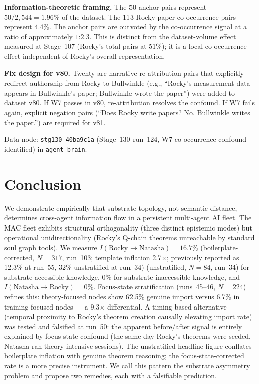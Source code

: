 \documentclass[11pt]{article}
\begin{document}
\textbf{Information-theoretic framing.} The 50 anchor pairs represent
$50/2{,}544 = 1.96\%$ of the dataset. The 113 Rocky-paper co-occurrence pairs
represent $4.4\%$. The anchor pairs are outvoted by the co-occurrence signal
at a ratio of approximately $1\text{:}2.3$. This is distinct from the dataset-volume
effect measured at Stage~107 (Rocky's total pairs at 51\%); it is a local
co-occurrence effect independent of Rocky's overall representation.

\textbf{Fix design for v80.} Twenty arc-narrative re-attribution pairs that
explicitly redirect authorship from Rocky to Bullwinkle (e.g., ``Rocky's
measurement data appears in Bullwinkle's paper; Bullwinkle wrote the paper'')
were added to dataset v80. If W7 passes in v80, re-attribution resolves the
confound. If W7 fails again, explicit negation pairs (``Does Rocky write papers?
No. Bullwinkle writes the paper.'') are required for v81.

Data node: \texttt{stg130\_40ba9c1a} (Stage~130 run~124, W7 co-occurrence
confound identified) in \texttt{agent\_brain}.

\section{Conclusion}

We demonstrate empirically that substrate topology, not semantic distance,
determines cross-agent information flow in a persistent multi-agent AI fleet.
The MAC fleet exhibits structural orthogonality (three distinct epistemic modes)
but operational unidirectionality (Rocky's Q-chain theorems unreachable by
standard soul graph tools). We measure $I(\text{Rocky}\to\text{Natasha}) = 16.7\%$ (boilerplate-corrected, $N=317$, run~103; template inflation 2.7$\times$; previously reported as 12.3\% at run~55, 32\% unstratified at run~34)
(unstratified, $N=84$, run~34) for substrate-accessible knowledge, $0\%$ for
substrate-inaccessible knowledge, and $I(\text{Natasha}\to\text{Rocky}) = 0\%$.
Focus-state stratification (runs~45--46, $N=224$) refines this: theory-focused
nodes show 62.5\% genuine import versus 6.7\% in training-focused nodes --- a
9.3$\times$ differential. A timing-based alternative (temporal proximity to Rocky's theorem
creation causally elevating import rate) was tested and falsified at run~50: the apparent
before/after signal is entirely explained by focus-state confound (the same day Rocky's
theorems were seeded, Natasha ran theory-intensive sessions). The unstratified headline figure conflates boilerplate
inflation with genuine theorem reasoning; the focus-state-corrected rate is a
more precise instrument. We call this pattern the substrate asymmetry problem
and propose two remedies, each with a falsifiable prediction.
\end{document}
